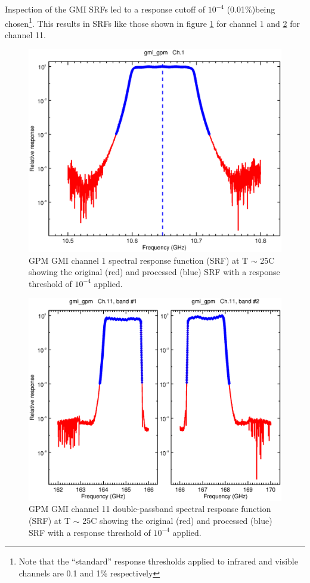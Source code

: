 Inspection of the GMI SRFs led to a response cutoff of $10^{-4}$ (0.01\%)being chosen\footnote{Note that the ``standard'' response thresholds applied to infrared and visible channels are 0.1 and 1\% respectively}. This results in SRFs like those shown in figure \ref{fig:gmi_gpm.with_threshold.channel1} for channel 1 and \ref{fig:gmi_gpm.with_threshold.channel11} for channel 11.

\begin{figure}[H]
  \centering
  \includegraphics[scale=0.8]{graphics/gmi_gpm.with_threshold.channel1.eps}
  \caption{GPM GMI channel 1 spectral response function (SRF) at T $\sim$ 25C showing the original (red) and processed (blue) SRF with a response threshold of $10^{-4}$ applied.}
  \label{fig:gmi_gpm.with_threshold.channel1}
\end{figure}

\begin{figure}[H]
  \centering
  \includegraphics[scale=0.8]{graphics/gmi_gpm.with_threshold.channel11.eps}
  \caption{GPM GMI channel 11 double-passband spectral response function (SRF) at T $\sim$ 25C showing the original (red) and processed (blue) SRF with a response threshold of $10^{-4}$ applied.}
  \label{fig:gmi_gpm.with_threshold.channel11}
\end{figure}


